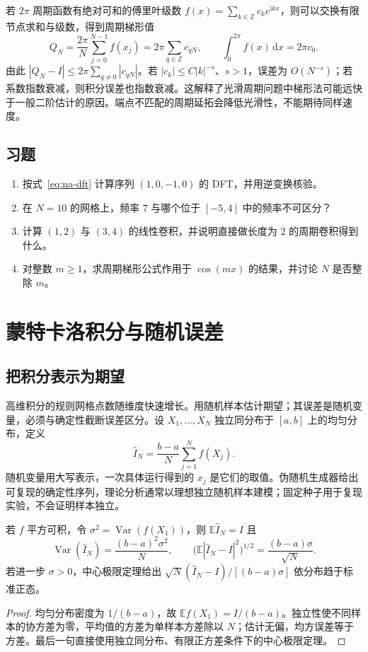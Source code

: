 \documentclass[UTF8,12pt,a4paper,fontset=fandol]{ctexbook}
\begin{document}
若 $2\pi$ 周期函数有绝对可和的傅里叶级数 $f(x)=\sum_{k\in\mathbb Z}c_ke^{\mathrm i kx}$，则可以交换有限节点求和与级数，得到周期梯形值
\[
 Q_N=\frac{2\pi}{N}\sum_{j=0}^{N-1}f(x_j)=2\pi\sum_{q\in\mathbb Z}c_{qN},\qquad
 \int_0^{2\pi}f(x)\,\mathrm dx=2\pi c_0.
\]
由此 $|Q_N-I|\le2\pi\sum_{q\ne0}|c_{qN}|$。若 $|c_k|\le C|k|^{-s}$、$s>1$，误差为 $O(N^{-s})$；若系数指数衰减，则积分误差也指数衰减。这解释了光滑周期问题中梯形法可能远快于一般二阶估计的原因。端点不匹配的周期延拓会降低光滑性，不能期待同样速度。

\section{习题}
\begin{enumerate}[label=\arabic*.]
\item\label{exr:na-fft-transform} 按式~\eqref{eq:na-dft} 计算序列 $(1,0,-1,0)$ 的 DFT，并用逆变换核验。
\item\label{exr:na-fft-alias} 在 $N=10$ 的网格上，频率 $7$ 与哪个位于 $[-5,4]$ 中的频率不可区分？
\item\label{exr:na-fft-convolution} 计算 $(1,2)$ 与 $(3,4)$ 的线性卷积，并说明直接做长度为 $2$ 的周期卷积得到什么。
\item\label{exr:na-fft-periodic} 对整数 $m\ge1$，求周期梯形公式作用于 $\cos(mx)$ 的结果，并讨论 $N$ 是否整除 $m$。
\end{enumerate}

\chapter{蒙特卡洛积分与随机误差}
\label{chap:na-montecarlo}

\section{把积分表示为期望}
高维积分的规则网格点数随维度快速增长。用随机样本估计期望；其误差是随机变量，必须与确定性截断误差区分。设 $X_1,\ldots,X_N$ 独立同分布于 $[a,b]$ 上的均匀分布，定义
\begin{equation}
 \widehat I_N=\frac{b-a}{N}\sum_{j=1}^Nf(X_j).
 \label{eq:na-mc}
\end{equation}
随机变量用大写表示，一次具体运行得到的 $x_j$ 是它们的取值。伪随机生成器给出可复现的确定性序列，理论分析通常以理想独立随机样本建模；固定种子用于复现实验，不会证明样本独立。

\begin{theorem}[蒙特卡洛估计的均值和方差]
若 $f$ 平方可积，令 $\sigma^2=\operatorname{Var}(f(X_1))$，则 $\mathbb E\widehat I_N=I$ 且
\[
 \operatorname{Var}(\widehat I_N)=\frac{(b-a)^2\sigma^2}{N},\qquad
 \bigl(\mathbb E|\widehat I_N-I|^2\bigr)^{1/2}=\frac{(b-a)\sigma}{\sqrt N}.
\]
若进一步 $\sigma>0$，中心极限定理给出 $\sqrt N(\widehat I_N-I)/[(b-a)\sigma]$ 依分布趋于标准正态。
\end{theorem}
\begin{proof}
均匀分布密度为 $1/(b-a)$，故 $\mathbb E f(X_1)=I/(b-a)$。独立性使不同样本的协方差为零，平均值的方差为单样本方差除以 $N$；估计无偏，均方误差等于方差。最后一句直接使用独立同分布、有限正方差条件下的中心极限定理。
\end{proof}
\end{document}
